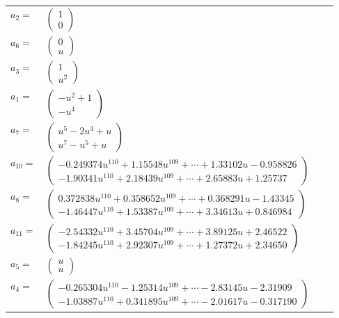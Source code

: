 \documentclass[1p]{elsarticle_modified}
\theoremstyle{definition}
\begin{document}
\begin{tabular}{m{7pt} m{180pt} m{7pt} m{180pt} }
\flushright $a_{2}=$&$\begin{pmatrix}1\\0\end{pmatrix}$ \\
\flushright $a_{6}=$&$\begin{pmatrix}0\\u\end{pmatrix}$ \\
\flushright $a_{3}=$&$\begin{pmatrix}1\\u^2\end{pmatrix}$ \\
\flushright $a_{1}=$&$\begin{pmatrix}- u^2+1\\- u^4\end{pmatrix}$ \\
\flushright $a_{7}=$&$\begin{pmatrix}u^5-2 u^3+u\\u^7- u^5+u\end{pmatrix}$ \\
\flushright $a_{10}=$&$\begin{pmatrix}-0.249374 u^{110}+1.15548 u^{109}+\cdots+1.33102 u-0.958826\\-1.90341 u^{110}+2.18439 u^{109}+\cdots+2.65883 u+1.25737\end{pmatrix}$ \\
\flushright $a_{8}=$&$\begin{pmatrix}0.372838 u^{110}+0.358652 u^{109}+\cdots+0.368291 u-1.43345\\-1.46447 u^{110}+1.53387 u^{109}+\cdots+3.34613 u+0.846984\end{pmatrix}$ \\
\flushright $a_{11}=$&$\begin{pmatrix}-2.54332 u^{110}+3.45704 u^{109}+\cdots+3.89125 u+2.46522\\-1.84245 u^{110}+2.92307 u^{109}+\cdots+1.27372 u+2.34650\end{pmatrix}$ \\
\flushright $a_{5}=$&$\begin{pmatrix}u\\u\end{pmatrix}$ \\
\flushright $a_{4}=$&$\begin{pmatrix}-0.265304 u^{110}-1.25314 u^{109}+\cdots-2.83145 u-2.31909\\-1.03887 u^{110}+0.341895 u^{109}+\cdots-2.01617 u-0.317190\end{pmatrix}$ \\

\end{tabular}
\end{document}
